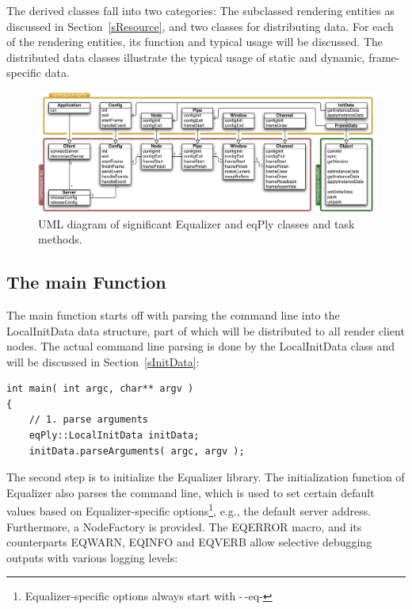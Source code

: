 \documentclass[10pt,a4]{scrartcl}
\newcommand{\sref}[1]{Section~\ref{#1}}
\begin{document}
The derived classes fall into two categories: The subclassed rendering
entities as discussed in \sref{sResource}, and two classes for
distributing data. For each of the rendering entities, its function and
typical usage will be discussed. The distributed data classes illustrate
the typical usage of static and dynamic, frame-specific data.

\begin{figure}[ht!]\center
  \includegraphics[width=\textwidth]{images/uml}
  {\caption{\small\label{fUml}UML diagram of significant Equalizer and
      eqPly classes and task methods.}}
\end{figure}


\subsection{The main Function}

The main function starts off with parsing the command line into the
\textsf{LocalInitData} data structure, part of which will be distributed
to all render client nodes. The actual command line parsing is done by
the \textsf{LocalInitData} class and will be discussed in
\sref{sInitData}:

{\footnotesize\begin{lstlisting}
int main( int argc, char** argv )
{
    // 1. parse arguments
    eqPly::LocalInitData initData;
    initData.parseArguments( argc, argv );
\end{lstlisting}}

The second step is to initialize the Equalizer library. The
initialization function of Equalizer also parses the command line, which
is used to set certain default values based on Equalizer-specific
options\footnote{Equalizer-specific options always start with -\,-eq-},
e.g., the default server address. Furthermore, a \textsf{NodeFactory} is
provided. The \textsf{EQERROR} macro, and its counterparts
\textsf{EQWARN}, \textsf{EQINFO} and \textsf{EQVERB} allow selective
debugging outputs with various logging levels:
\end{document}
